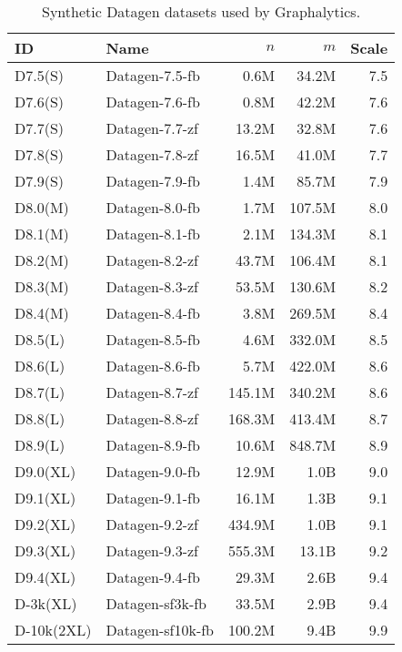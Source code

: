 \begin{table}[t!]
\centering
\begin{tabular}{|l|l|r|r|r|}
\hline
\textbf{ID} & \textbf{Name} & $n$ & $m$ & \textbf{Scale} \\
\hline \hline
D7.5(S) & Datagen-7.5-fb & 0.6M & 34.2M & 7.5 \\ \hline
D7.6(S) & Datagen-7.6-fb & 0.8M & 42.2M & 7.6 \\ \hline
D7.7(S) & Datagen-7.7-zf & 13.2M & 32.8M & 7.6 \\ \hline
D7.8(S) & Datagen-7.8-zf & 16.5M & 41.0M & 7.7 \\ \hline
D7.9(S) & Datagen-7.9-fb & 1.4M & 85.7M & 7.9 \\ \hline
D8.0(M) & Datagen-8.0-fb & 1.7M & 107.5M & 8.0 \\ \hline
D8.1(M) & Datagen-8.1-fb & 2.1M & 134.3M & 8.1 \\ \hline
D8.2(M) & Datagen-8.2-zf & 43.7M & 106.4M & 8.1 \\ \hline
D8.3(M) & Datagen-8.3-zf & 53.5M & 130.6M & 8.2 \\ \hline
D8.4(M) & Datagen-8.4-fb & 3.8M & 269.5M & 8.4 \\ \hline
D8.5(L) & Datagen-8.5-fb & 4.6M & 332.0M & 8.5 \\ \hline
D8.6(L) & Datagen-8.6-fb & 5.7M & 422.0M & 8.6 \\ \hline
D8.7(L) & Datagen-8.7-zf & 145.1M & 340.2M & 8.6 \\ \hline
D8.8(L) & Datagen-8.8-zf & 168.3M & 413.4M & 8.7 \\ \hline
D8.9(L) & Datagen-8.9-fb & 10.6M & 848.7M & 8.9 \\ \hline
D9.0(XL) & Datagen-9.0-fb & 12.9M & 1.0B & 9.0 \\ \hline
D9.1(XL) & Datagen-9.1-fb & 16.1M & 1.3B & 9.1 \\ \hline
D9.2(XL) & Datagen-9.2-zf & 434.9M & 1.0B & 9.1 \\ \hline
D9.3(XL) & Datagen-9.3-zf & 555.3M & 13.1B & 9.2 \\ \hline
D9.4(XL) & Datagen-9.4-fb & 29.3M & 2.6B & 9.4 \\ \hline
D-3k(XL) & Datagen-sf3k-fb & 33.5M & 2.9B & 9.4 \\ \hline
D-10k(2XL) & Datagen-sf10k-fb & 100.2M & 9.4B & 9.9 \\ \hline
\end{tabular}
\caption{Synthetic Datagen datasets used by Graphalytics.}
\label{tab:datagen-datasets}
\end{table}



